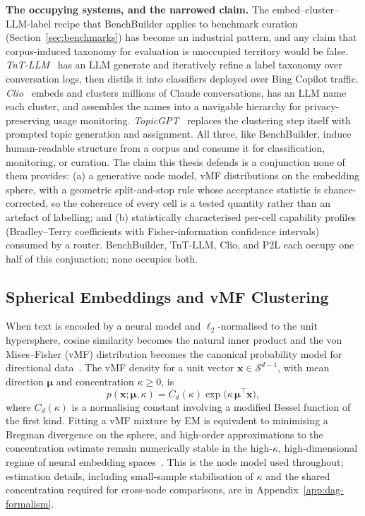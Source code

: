 \textbf{The occupying systems, and the narrowed claim.} The
embed--cluster--LLM-label recipe that BenchBuilder applies to
benchmark curation (Section~\ref{sec:benchmarks}) has become an
industrial pattern, and any claim that corpus-induced taxonomy for
evaluation is unoccupied territory would be false.
\textit{TnT-LLM}~\parencite{wan2024tntllm} has an LLM generate and
iteratively refine a label taxonomy over conversation logs, then
distils it into classifiers deployed over Bing Copilot traffic.
\textit{Clio}~\parencite{tamkin2024clio} embeds and clusters millions
of Claude conversations, has an LLM name each cluster, and assembles
the names into a navigable hierarchy for privacy-preserving usage
monitoring. \textit{TopicGPT}~\parencite{pham2024topicgpt} replaces
the clustering step itself with prompted topic generation and
assignment. All three, like BenchBuilder, induce human-readable
structure from a corpus and consume it for classification,
monitoring, or curation. The claim this thesis defends is a
conjunction none of them provides: (a) a generative node model, vMF
distributions on the embedding sphere, with a geometric
split-and-stop rule whose acceptance statistic is chance-corrected,
so the coherence of every cell is a tested quantity rather than an
artefact of labelling; and (b) statistically characterised per-cell
capability profiles (Bradley--Terry coefficients with
Fisher-information confidence intervals) consumed by a router.
BenchBuilder, TnT-LLM, Clio, and P2L each occupy one half of this
conjunction; none occupies both.

\subsection*{Spherical Embeddings and vMF Clustering}

When text is encoded by a neural model and $\ell_2$-normalised to the
unit hypersphere, cosine similarity becomes the natural inner product
and the von Mises--Fisher (vMF) distribution becomes the canonical
probability model for directional data~\parencite{banerjee2005vmf}.
The vMF density for a unit vector $\mathbf{x} \in \mathcal{S}^{d-1}$,
with mean direction $\boldsymbol{\mu}$ and concentration
$\kappa \geq 0$, is
\begin{equation}
    p(\mathbf{x};\boldsymbol{\mu},\kappa) =
    C_d(\kappa)\exp\!\bigl(\kappa\,\boldsymbol{\mu}^\top\mathbf{x}\bigr),
    \label{eq:vmf}
\end{equation}
where $C_d(\kappa)$ is a normalising constant involving a modified
Bessel function of the first kind. Fitting a vMF mixture by EM is
equivalent to minimising a Bregman divergence on the sphere, and
high-order approximations to the concentration estimate remain
numerically stable in the high-$\kappa$, high-dimensional regime of
neural embedding spaces~\parencite{banerjee2005vmf, hornik2014vmf}.
This is the node model used throughout; estimation details, including
small-sample stabilisation of $\kappa$ and the shared concentration
required for cross-node comparisons, are in
Appendix~\ref{app:dag-formalism}.

